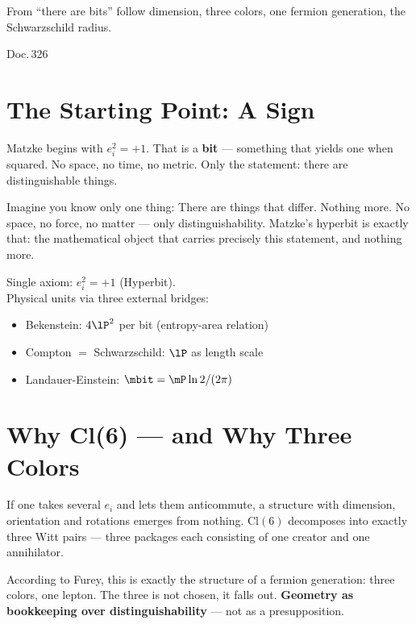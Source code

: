 
\epigraph{From \enquote{there are bits} follow dimension, three colors,
one fermion generation, the Schwarzschild radius.}{Doc.\,326}

\section{The Starting Point: A Sign}

Matzke begins with $e_i^2 = +1$. That is a \textbf{bit} --- something that
yields one when squared. No space, no time, no metric. Only the
statement: there are distinguishable things. 

\begin{laierspur}
Imagine you know only one thing: There are things that differ.
Nothing more. No space, no force, no matter --- only distinguishability.
Matzke's hyperbit is exactly that: the mathematical object that carries precisely this
statement, and nothing more.
\end{laierspur}

\begin{matzbox}
 Single axiom: $e_i^2 = +1$ (Hyperbit).\\[4pt]
Physical units via three external bridges:
\begin{itemize}
  \item Bekenstein: $4\lP^2$ per bit (entropy-area relation)
  \item Compton $=$ Schwarzschild: $\lP$ as length scale
  \item Landauer-Einstein: $\mbit = \mP \ln 2 / (2\pi)$
\end{itemize}
\end{matzbox}

\section{Why Cl(6) --- and Why Three Colors}

If one takes several $e_i$ and lets them anticommute, a structure with
dimension, orientation and rotations emerges from nothing. $\mathrm{Cl}(6)$
decomposes into exactly three Witt pairs --- three packages each consisting of one creator
and one annihilator. 

According to Furey, this is exactly the structure of a fermion generation: three colors,
one lepton. The three is not chosen, it falls out.
\textbf{Geometry as bookkeeping over distinguishability} --- not as
a presupposition.

